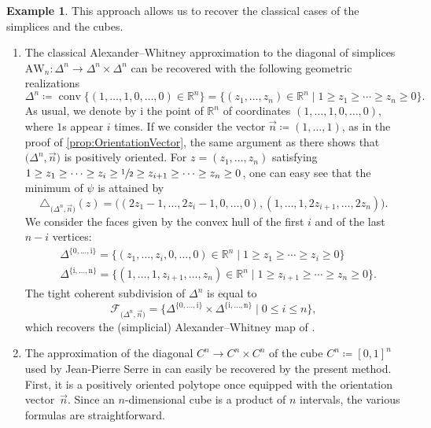 \documentclass[JEP,XML,SOM,Unicode,NoFloatCountersInSection]{cedram}
\let\mathcal\mathscr
\theoremstyle{plain}
\theoremstyle{definition}
\newtheorem{example}{Example}
\newcommand{\RR}{\mathbb{R}}
\newcommand{\sF}{\mathcal{F}}
\DeclareMathOperator{\conv}{conv}
\begin{document}
\begin{example} This approach allows us to recover the classical cases of the simplices and the cubes.
\begin{enumerate}
\item The classical Alexander--Whitney approximation to the diagonal of simplices $\mathrm{AW}_n : \Delta^n \to \Delta^n\times \Delta^n$ can be recovered with the following geometric realizations
\[\Delta^n\coloneqq\conv\big\{(1, \ldots, 1, 0,\ldots, 0)\in \RR^n\big\}=
\big\{(z_1, \ldots, z_n)\in \RR^n\mid
1 \geq z_1\geq \cdots \geq z_n \geq 0
\big\}.
\]
As usual, we denote by $\mathrm{i}$ the point of $\RR^n$ of coordinates $(1, \ldots, 1, 0,\ldots, 0)$,
where $1$s appear $i$ times. If we consider the vector $\vec n\coloneqq (1, \ldots, 1)$, as in the proof of \cref{prop:OrientationVector}, the same argument as there shows that $\big(\Delta^n, \vec n \big)$ is
positively oriented.
For $z=(z_1, \ldots, z_n)$ satisfying
$1 \geq z_1\geq \cdots \geq z_i \geq \sfrac{1}{2} \geq z_{i+1}\geq \cdots \geq z_n \geq 0$,
one can easy see that the minimum of $\psi$ is attained by
\[
\triangle_{\big(\Delta^n, \vec n\big)}(z)=
\big((
2z_1-1, \ldots, 2z_i-1, 0, \ldots, 0),
(
1, \ldots, 1,
2z_{i+1}, \ldots, 2z_n
)\big).
\]
We consider the faces given by the convex hull of the first $i$ and of the last $n-i$ vertices:
\begin{align*}
&\Delta^{\{\mathrm{0}, \ldots, \mathrm{i} \}}=
\big\{(z_1, \ldots, z_i, 0, \ldots, 0)\in \RR^n\mid
1 \geq z_1\geq \cdots \geq z_i \geq 0
\big\}\\
\tag*{and}&
\Delta^{\{\mathrm{i}, \ldots, \mathrm{n} \}}=
\big\{(1, \ldots, 1, z_{i+1}, \ldots, z_n)\in \RR^n\mid
1 \geq z_{i+1}\geq \cdots \geq z_n \geq 0
\big\}.
\end{align*}
The tight coherent subdivision of $\Delta^n$ is
equal to
\[\sF_{\big(\Delta^n, \vec n\big)}=
\bigl\{\Delta^{\{\mathrm{0}, \ldots, \mathrm{i} \}} \times \Delta^{\{\mathrm{i}, \ldots, \mathrm{n} \}} \mid
0 \leq i \leq n
\bigr\},
\]
which recovers the (simplicial) Alexander--Whitney map of \cite{EilenbergZilber53, EilenbergMacLane54}.

\item The approximation of the diagonal $C^n \to C^n\times C^n$ of the cube $C^n\coloneqq [0,1]^n$ used by Jean-Pierre Serre in \cite{Serre51} can easily be recovered by the present method. First, it is a positively oriented polytope once equipped with the orientation vector~$\vec n$. Since an $n$-dimensional cube is a product of $n$ intervals, the various formulas are straightforward.
\end{enumerate}
\end{example}
\end{document}
